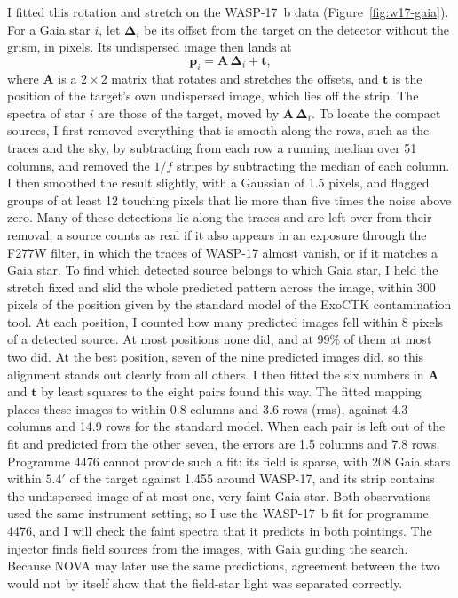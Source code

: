 I fitted this rotation and stretch on the WASP-17~b data
(Figure~\ref{fig:w17-gaia}). For a Gaia star $i$, let
$\boldsymbol{\Delta}_i$ be its offset from the target on the detector without
the grism, in pixels. Its undispersed image then lands at
\begin{equation}
  \mathbf{p}_i = \mathbf{A}\,\boldsymbol{\Delta}_i + \mathbf{t},
  \label{eq:gaia-map}
\end{equation}
where $\mathbf{A}$ is a $2\times2$ matrix that rotates and stretches the
offsets, and $\mathbf{t}$ is the position of the target's own undispersed
image, which lies off the strip. The spectra of star $i$ are those of the
target, moved by $\mathbf{A}\,\boldsymbol{\Delta}_i$. To locate the compact
sources, I first removed everything that is smooth along the rows, such as
the traces and the sky, by subtracting from each row a running median over 51
columns, and removed the $1/f$ stripes by subtracting the median of each
column. I then smoothed the result slightly, with a Gaussian of 1.5 pixels,
and flagged groups of at least 12 touching pixels that lie more than five
times the noise above zero. Many of these detections lie along the traces and
are left over from their removal; a source counts as real if it also appears
in an exposure through the F277W filter, in which the traces of WASP-17
almost vanish, or if it matches a Gaia star. To find which detected source
belongs to which Gaia star, I held the stretch fixed and slid the whole
predicted pattern across the image, within 300 pixels of the position given
by the standard model of the ExoCTK contamination tool. At each position, I
counted how many predicted images fell within 8 pixels of a detected source.
At most positions none did, and at 99\% of them at most two did. At the best position, seven of the nine predicted images did, so this alignment stands out clearly from all others. I then fitted the six numbers in
$\mathbf{A}$ and $\mathbf{t}$ by least squares to the eight pairs found this
way. The fitted mapping places these images to within 0.8 columns and 3.6 rows
(rms), against 4.3 columns and 14.9 rows for the standard model. When each pair
is left out of the fit and predicted from the other seven, the errors are 1.5
columns and 7.8 rows. Programme 4476 cannot provide such a fit: its field is
sparse, with 208 Gaia stars within $5.4'$ of the target against 1,455 around
WASP-17, and its strip contains the undispersed image of at most one, very
faint Gaia star. Both observations used the same instrument setting, so I use
the WASP-17~b fit for programme 4476, and I will check the faint spectra that it predicts in both pointings. The injector finds field sources from the images, with Gaia guiding the search. Because NOVA may later use the same predictions, agreement between the two would not by itself show that the field-star light was separated correctly.

